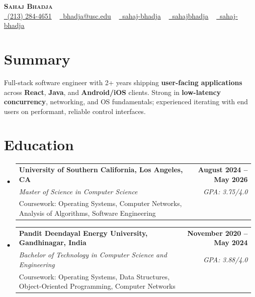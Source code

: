 \documentclass[letterpaper,10pt]{article}
\makeatletter
\newcommand{\resumeEduSubheading}[5]{\vspace{-1pt}\item\begin{tabular*}{1.0\textwidth}[t]{l@{\extracolsep{\fill}}r}\textbf{#1} & \textbf{\small #2} \\\textit{\small #3} & \textit{\small #4} \\\small #5 & \\\end{tabular*}\vspace{-4pt}}
\newcommand{\resumeSubHeadingListStart}{\begin{itemize}[leftmargin=0.0in, label={}]}
\newcommand{\resumeSubHeadingListEnd}{\end{itemize}}
\makeatother
\begin{document}
\begin{center}
{\Huge \scshape \textbf{Sahaj Bhadja}} \\ \vspace{1pt}
\small \href{tel:(213) 284-4651}{\faPhone\ \underline{(213) 284-4651}} ~ \href{mailto:bhadja@usc.edu}{\raisebox{-0.2\height}\faEnvelope\ \underline{bhadja@usc.edu}} ~
\href{https://www.linkedin.com/in/sahaj-bhadja/}{\raisebox{-0.2\height}\faLinkedin\ \underline{sahaj-bhadja}} ~ \href{https://github.com/SAHAJ-BHADJA}{\raisebox{-0.2\height}\faGithub\ \underline{sahajbhadja}} ~
\href{https://sahaj-bhadja.vercel.app/}{\raisebox{-0.2\height}\faGlobe\ \underline{sahaj-bhadja}}
\end{center}
\vspace{-18pt}
\section{Summary}
\begin{itemize}[leftmargin=0.15in, label={}]
\small{\item{Full-stack software engineer with 2+ years shipping \textbf{user-facing applications} across \textbf{React}, \textbf{Java}, and \textbf{Android/iOS} clients. Strong in \textbf{low-latency concurrency}, networking, and OS fundamentals; experienced iterating with end users on performant, reliable control interfaces.}}
\end{itemize}
\vspace{-16pt}
\section{Education}
\resumeSubHeadingListStart
\resumeEduSubheading{University of Southern California, Los Angeles, CA}{August 2024 -- May 2026}{Master of Science in Computer Science}{GPA: 3.75/4.0}{Coursework: Operating Systems, Computer Networks, Analysis of Algorithms, Software Engineering}
\vspace{-9pt}
\resumeEduSubheading{Pandit Deendayal Energy University, Gandhinagar, India}{November 2020 -- May 2024}{Bachelor of Technology in Computer Science and Engineering}{GPA: 3.88/4.0}{Coursework: Operating Systems, Data Structures, Object-Oriented Programming, Computer Networks}
\resumeSubHeadingListEnd
\vspace{-14pt}
\end{document}
